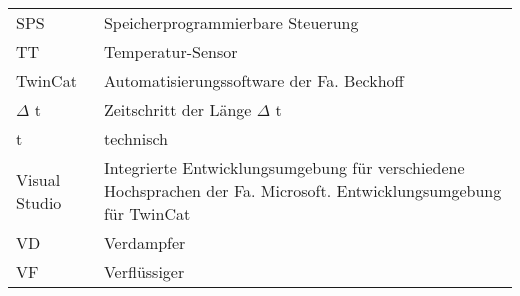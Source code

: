 \begin{onehalfspacing}
\begin{longtable}[h]{p{} p{}}
		SPS & Speicherprogrammierbare Steuerung \\
		TT & Temperatur-Sensor\\
		TwinCat & Automatisierungssoftware der Fa. Beckhoff\\
		$\Delta$ t & Zeitschritt der Länge $\Delta$ t\\
		t & technisch\\
		Visual Studio & Integrierte Entwicklungsumgebung für verschiedene Hochsprachen der Fa. Microsoft. Entwicklungsumgebung für TwinCat\\
		VD & Verdampfer \\
		VF & Verflüssiger \\

		
\end{longtable}
\end{onehalfspacing}

